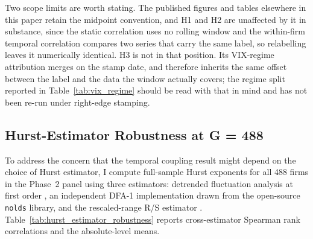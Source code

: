 \documentclass[preprint,12pt,authoryear]{elsarticle}
\begin{document}
Two scope limits are worth stating. The published figures and tables elsewhere in this paper retain the midpoint convention, and H1 and H2 are unaffected by it in substance, since the static correlation uses no rolling window and the within-firm temporal correlation compares two series that carry the same label, so relabelling leaves it numerically identical. H3 is not in that position. Its VIX-regime attribution merges on the stamp date, and therefore inherits the same offset between the label and the data the window actually covers; the regime split reported in Table~\ref{tab:vix_regime} should be read with that in mind and has not been re-run under right-edge stamping.

\subsection{Hurst-Estimator Robustness at G = 488}

To address the concern that the temporal coupling result might depend on the choice of Hurst estimator, I compute full-sample Hurst exponents for all 488 firms in the Phase~2 panel using three estimators: detrended fluctuation analysis at first order \citep{peng1994mosaic}, an independent DFA-1 implementation drawn from the open-source \texttt{nolds} library, and the rescaled-range R/S estimator \citep{hurst1951long, lo1991long}. Table~\ref{tab:hurst_estimator_robustness} reports cross-estimator Spearman rank correlations and the absolute-level means.
\end{document}
